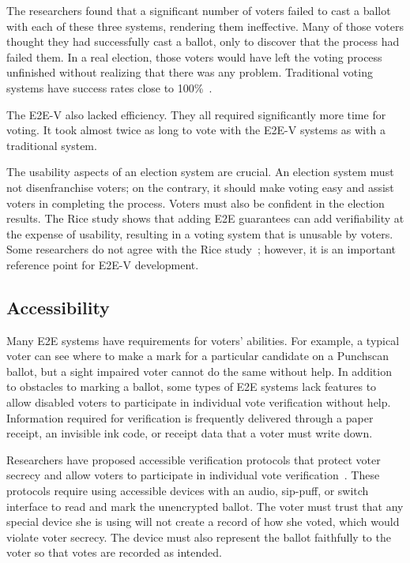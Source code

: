 The researchers found that a significant number of voters failed to
cast a ballot with each of these three systems, rendering them
ineffective. Many of those voters thought they had successfully cast a
ballot, only to discover that the process had failed them. In a real
election, those voters would have left the voting process unfinished
without realizing that there was any problem. Traditional voting
systems have success rates close to 100\%~\cite{byrne2007usability}.

The E2E-V also lacked efficiency. They all required significantly more
time for voting. It took almost twice as long to vote with the E2E-V
systems as with a traditional system.

The usability aspects of an election system are crucial. An election
system must not disenfranchise voters; on the contrary, it should
make voting easy and assist voters in completing the process. Voters
must also be confident in the election results. The Rice study
shows that adding E2E guarantees can add verifiability at the expense
of usability, resulting in a voting system that is unusable by
voters. Some researchers do not agree with the Rice
study~\cite{mcburnett2014}; however, it is an important reference
point for E2E-V development. 

\subsection{Accessibility}

Many E2E systems have requirements for voters' abilities. For example,
a typical voter can see where to make a mark for a particular
candidate on a Punchscan ballot, but a sight impaired voter cannot do
the same without help. In addition to obstacles to marking a ballot,
some types of E2E systems lack features to allow disabled voters to
participate in individual vote verification without help. Information
required for verification is frequently delivered through a paper
receipt, an invisible ink code, or receipt data that a voter must
write down.

Researchers have proposed accessible verification protocols that
protect voter secrecy and allow voters to participate in individual
vote verification~\cite{chaum2009accessible}. These protocols require
using accessible devices with an audio, sip-puff, or switch interface
to read and mark the unencrypted ballot. The voter must trust that any
special device she is using will not create a record of how she voted,
which would violate voter secrecy. The device must also represent the
ballot faithfully to the voter so that votes are recorded as intended.

